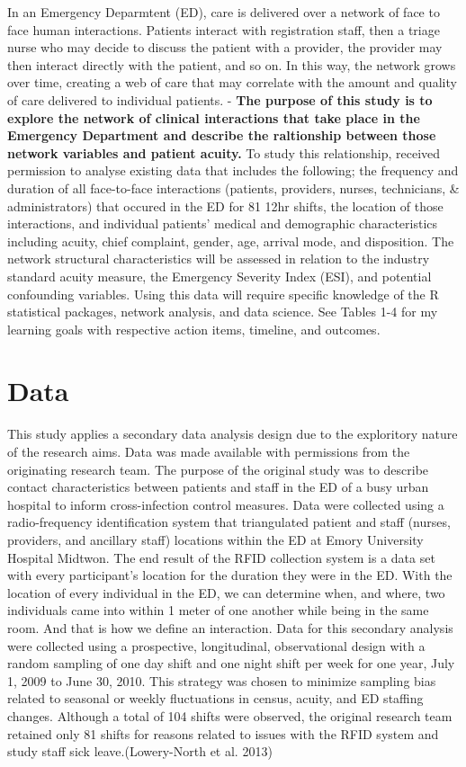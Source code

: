 \documentclass[]{elsarticle} %
\begin{document}
In an Emergency Deparmtent (ED), care is delivered over a network of
face to face human interactions. Patients interact with registration
staff, then a triage nurse who may decide to discuss the patient with a
provider, the provider may then interact directly with the patient, and
so on. In this way, the network grows over time, creating a web of care
that may correlate with the amount and quality of care delivered to
individual patients. - \textbf{The purpose of this study is to explore
the network of clinical interactions that take place in the Emergency
Department and describe the raltionship between those network variables
and patient acuity.} To study this relationship, received permission to
analyse existing data that includes the following; the frequency and
duration of all face-to-face interactions (patients, providers, nurses,
technicians, \& administrators) that occured in the ED for 81 12hr
shifts, the location of those interactions, and individual patients'
medical and demographic characteristics including acuity, chief
complaint, gender, age, arrival mode, and disposition. The network
structural characteristics will be assessed in relation to the industry
standard acuity measure, the Emergency Severity Index (ESI), and
potential confounding variables. Using this data will require specific
knowledge of the R statistical packages, network analysis, and data
science. See Tables 1-4 for my learning goals with respective action
items, timeline, and outcomes.

\section{Data}\label{data}

This study applies a secondary data analysis design due to the
exploritory nature of the research aims. Data was made available with
permissions from the originating research team. The purpose of the
original study was to describe contact characteristics between patients
and staff in the ED of a busy urban hospital to inform cross-infection
control measures. Data were collected using a radio-frequency
identification system that triangulated patient and staff (nurses,
providers, and ancillary staff) locations within the ED at Emory
University Hospital Midtwon. The end result of the RFID collection
system is a data set with every participant's location for the duration
they were in the ED. With the location of every individual in the ED, we
can determine when, and where, two individuals came into within 1 meter
of one another while being in the same room. And that is how we define
an interaction. Data for this secondary analysis were collected using a
prospective, longitudinal, observational design with a random sampling
of one day shift and one night shift per week for one year, July 1, 2009
to June 30, 2010. This strategy was chosen to minimize sampling bias
related to seasonal or weekly fluctuations in census, acuity, and ED
staffing changes. Although a total of 104 shifts were observed, the
original research team retained only 81 shifts for reasons related to
issues with the RFID system and study staff sick leave.(Lowery-North et
al. 2013)
\end{document}
